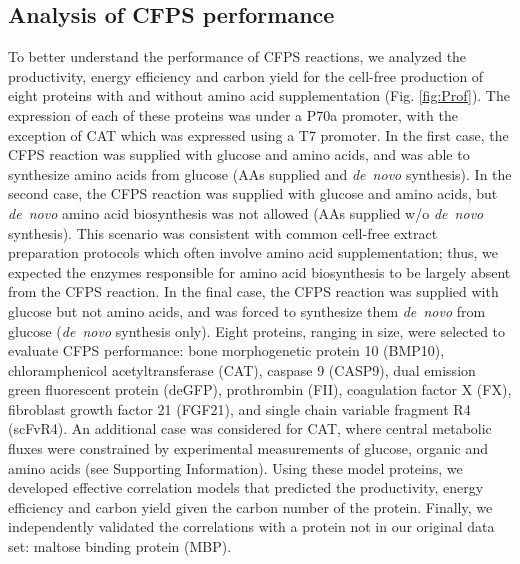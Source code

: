 \documentclass[journal=asbcd6,manuscript=article]{achemso}
\begin{document}

\subsection{Analysis of CFPS performance}
To better understand the performance of CFPS reactions, we analyzed the productivity, energy efficiency and carbon yield for the cell-free production of eight proteins with and without amino acid supplementation (Fig. \ref{fig:Prof}).
The expression of each of these proteins was under a P70a promoter, with the exception of CAT which was expressed using a T7 promoter.
In the first case, the CFPS reaction was supplied with glucose and amino acids, and was able to synthesize amino acids from glucose (AAs supplied and \textit{de~novo} synthesis).
In the second case, the CFPS reaction was supplied with glucose and amino acids, but \textit{de~novo} amino acid biosynthesis was not allowed (AAs supplied w/o \textit{de~novo} synthesis).
This scenario was consistent with common cell-free extract preparation protocols which often involve amino acid supplementation; thus, we expected the enzymes responsible for amino acid biosynthesis to be largely absent from the CFPS reaction.
In the final case, the CFPS reaction was supplied with glucose but not amino acids, and was forced to synthesize them \textit{de~novo} from glucose (\textit{de~novo} synthesis only).
Eight proteins, ranging in size, were selected to evaluate CFPS performance: bone morphogenetic protein 10 (BMP10), chloramphenicol acetyltransferase (CAT), caspase 9 (CASP9), dual emission green fluorescent protein (deGFP), prothrombin (FII), coagulation factor X (FX), fibroblast growth factor 21 (FGF21), and single chain variable fragment R4 (scFvR4).
An additional case was considered for CAT, where central metabolic fluxes were constrained by experimental measurements of glucose, organic and amino acids (see Supporting Information).
Using these model proteins, we developed effective correlation models that predicted the productivity, energy efficiency and carbon yield given the carbon number of the protein.
Finally, we independently validated the correlations with a protein not in our original data set: maltose binding protein (MBP).
\end{document}
